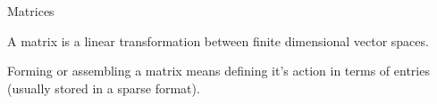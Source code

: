 \begin{frame}{Matrices}
  \begin{definition}[Matrix]
    A \alert{matrix} is a linear transformation between finite dimensional vector spaces.
  \end{definition}
  \begin{definition}
    \alert{Forming} or \alert{assembling} a matrix means defining it's action in terms of entries (usually stored in a sparse format).
  \end{definition}
\end{frame}
